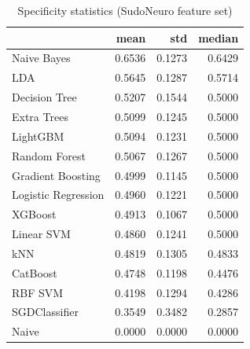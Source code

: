 \begin{table}
\caption{Specificity statistics (SudoNeuro feature set)}
\label{tab:specificity_SudoNeuro_stats}
\begin{tabular}{lrrr}
\toprule
 & mean & std & median \\
\midrule
Naive Bayes & 0.6536 & 0.1273 & 0.6429 \\
LDA & 0.5645 & 0.1287 & 0.5714 \\
Decision Tree & 0.5207 & 0.1544 & 0.5000 \\
Extra Trees & 0.5099 & 0.1245 & 0.5000 \\
LightGBM & 0.5094 & 0.1231 & 0.5000 \\
Random Forest & 0.5067 & 0.1267 & 0.5000 \\
Gradient Boosting & 0.4999 & 0.1145 & 0.5000 \\
Logistic Regression & 0.4960 & 0.1221 & 0.5000 \\
XGBoost & 0.4913 & 0.1067 & 0.5000 \\
Linear SVM & 0.4860 & 0.1241 & 0.5000 \\
kNN & 0.4819 & 0.1305 & 0.4833 \\
CatBoost & 0.4748 & 0.1198 & 0.4476 \\
RBF SVM & 0.4198 & 0.1294 & 0.4286 \\
SGDClassifier & 0.3549 & 0.3482 & 0.2857 \\
Naive & 0.0000 & 0.0000 & 0.0000 \\
\bottomrule
\end{tabular}
\end{table}
